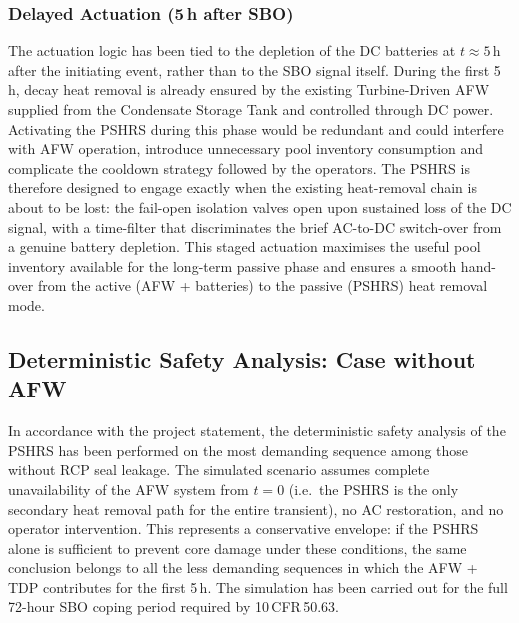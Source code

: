 \documentclass[a4paper,11pt]{article}
\numberwithin{subsubsection}{subsection}
\numberwithin{subsection}{section}
\begin{document}
\subsubsection{Delayed Actuation (5\,h after SBO)}
The actuation logic has been tied to the depletion of the DC batteries
at $t \approx 5$\,h after the initiating event, rather than to the SBO
signal itself. During the first 5\,h, decay heat removal is already
ensured by the existing Turbine-Driven AFW supplied from the
Condensate Storage Tank and controlled through DC power. Activating
the PSHRS during this phase would be redundant and could interfere
with AFW operation, introduce unnecessary pool inventory consumption
and complicate the cooldown strategy followed by the operators.
The PSHRS is therefore designed to engage exactly when the existing
heat-removal chain is about to be lost: the fail-open isolation valves
open upon sustained loss of the DC signal, with a time-filter that
discriminates the brief AC-to-DC switch-over from a genuine battery
depletion. This staged actuation maximises the useful pool inventory
available for the long-term passive phase and ensures a smooth
hand-over from the active (AFW + batteries) to the passive (PSHRS)
heat removal mode.


\subsection{Deterministic Safety Analysis: Case without AFW}
\label{sec:pshrs_dsa}

In accordance with the project statement, the deterministic safety analysis
of the PSHRS has been performed on the most demanding sequence among those
without RCP seal leakage. The simulated scenario assumes complete
unavailability of the AFW system from $t = 0$ (i.e.\ the PSHRS is the only
secondary heat removal path for the entire transient), no AC restoration,
and no operator intervention. This represents a conservative envelope:
if the PSHRS alone is sufficient to prevent core damage under these
conditions, the same conclusion belongs to all the less
demanding sequences in which the AFW + TDP contributes for the first
5\,h. The simulation has been carried out for the full 72-hour SBO coping
period required by 10\,CFR\,50.63.
\end{document}
